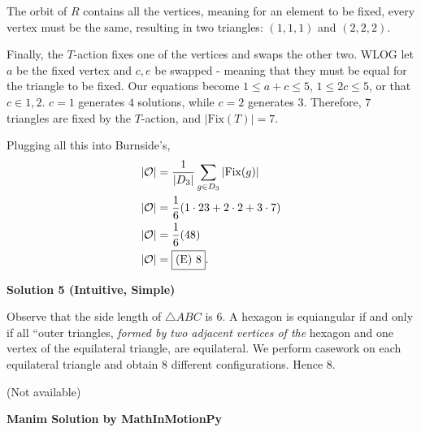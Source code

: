 \begin{enumerate}
 The orbit of $R$ contains all the vertices, meaning for an element to be fixed, every vertex must be the same, resulting in two triangles: $(1,1,1)$ and $(2,2,2)$. 

 Finally, the $T$-action fixes one of the vertices and swaps the other two. WLOG let $a$ be the fixed vertex and ${c,e}$ be swapped - meaning that they must be equal for the triangle to be fixed. Our equations become $1 \leq a+c \leq 5$, $1 \leq 2c \leq 5$, or that $c \in {1,2}$. $c=1$ generates $4$ solutions, while $c=2$ generates $3$. Therefore, $7$ triangles are fixed by the $T$-action, and $|\text{Fix}(T)|=7$.

 Plugging all this into Burnside's, \begin{align*}|\mathcal{O}| &= \frac{1}{|D_3|}\sum_{g \in D_3} |\text{Fix}(g)| \\|\mathcal{O}| &= \frac{1}{6}(1 \cdot 23+2 \cdot 2 + 3 \cdot 7) \\|\mathcal{O}| &= \frac{1}{6}(48) \\|\mathcal{O}| &= \fbox{(E) 8}.\end{align*}


 



\textbf{Solution 5 (Intuitive, Simple)}

Observe that the side length of $\triangle ABC$ is $6$. A hexagon is equiangular if and only if all ``outer triangles,\textit{ formed by two adjacent vertices of the }hexagon and one vertex of the equilateral triangle, are equilateral. We perform casework on each equilateral triangle and obtain $8$ different configurations. Hence $\boxed{8}$.

 (Not available)

 \textbf{Manim Solution by MathInMotionPy} 


\end{enumerate}